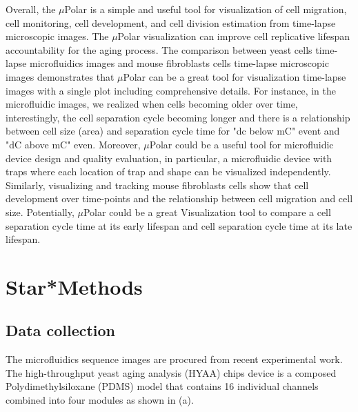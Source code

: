 \documentclass[conference]{IEEEtran}
\begin{document}
Overall, the $\mu$Polar is a simple and useful tool for visualization of cell migration, cell monitoring, cell development, and cell division estimation from time-lapse microscopic images. The $\mu$Polar visualization can improve cell replicative lifespan accountability for the aging process. The comparison between yeast cells time-lapse microfluidics images and mouse fibroblasts cells time-lapse microscopic images demonstrates that $\mu$Polar can be a great tool for visualization time-lapse images with a single plot including comprehensive details. For instance, in the microfluidic images, we realized when cells becoming older over time, interestingly, the cell separation cycle becoming longer and there is a relationship between cell size (area) and separation cycle time for "dc below mC" event and "dC above mC" even. Moreover, $\mu$Polar could be a useful tool for microfluidic device design and quality evaluation, in particular, a microfluidic device with traps where each location of trap and shape can be visualized independently. Similarly, visualizing and tracking mouse fibroblasts cells show that cell development over time-points and the relationship between cell migration and cell size. Potentially, $\mu$Polar could be a great Visualization tool to compare a cell separation cycle time at its early lifespan and cell separation cycle time at its late lifespan.

  

\section{Star*Methods}

\subsection*{Data collection}
The microfluidics sequence images are procured from \cite{ref13} recent experimental work. The high-throughput yeast aging analysis (HYAA) chips device is a composed Polydimethylsiloxane (PDMS) model that contains 16 individual channels combined into four modules as shown in (a).
\end{document}
